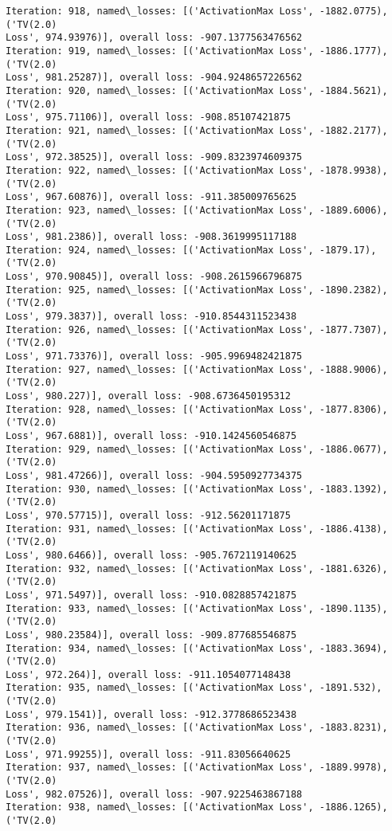\documentclass[10pt]{article}
\begin{document}
\begin{Verbatim}[commandchars=\\\{\}]
Iteration: 918, named\_losses: [('ActivationMax Loss', -1882.0775), ('TV(2.0)
Loss', 974.93976)], overall loss: -907.1377563476562
Iteration: 919, named\_losses: [('ActivationMax Loss', -1886.1777), ('TV(2.0)
Loss', 981.25287)], overall loss: -904.9248657226562
Iteration: 920, named\_losses: [('ActivationMax Loss', -1884.5621), ('TV(2.0)
Loss', 975.71106)], overall loss: -908.85107421875
Iteration: 921, named\_losses: [('ActivationMax Loss', -1882.2177), ('TV(2.0)
Loss', 972.38525)], overall loss: -909.8323974609375
Iteration: 922, named\_losses: [('ActivationMax Loss', -1878.9938), ('TV(2.0)
Loss', 967.60876)], overall loss: -911.385009765625
Iteration: 923, named\_losses: [('ActivationMax Loss', -1889.6006), ('TV(2.0)
Loss', 981.2386)], overall loss: -908.3619995117188
Iteration: 924, named\_losses: [('ActivationMax Loss', -1879.17), ('TV(2.0)
Loss', 970.90845)], overall loss: -908.2615966796875
Iteration: 925, named\_losses: [('ActivationMax Loss', -1890.2382), ('TV(2.0)
Loss', 979.3837)], overall loss: -910.8544311523438
Iteration: 926, named\_losses: [('ActivationMax Loss', -1877.7307), ('TV(2.0)
Loss', 971.73376)], overall loss: -905.9969482421875
Iteration: 927, named\_losses: [('ActivationMax Loss', -1888.9006), ('TV(2.0)
Loss', 980.227)], overall loss: -908.6736450195312
Iteration: 928, named\_losses: [('ActivationMax Loss', -1877.8306), ('TV(2.0)
Loss', 967.6881)], overall loss: -910.1424560546875
Iteration: 929, named\_losses: [('ActivationMax Loss', -1886.0677), ('TV(2.0)
Loss', 981.47266)], overall loss: -904.5950927734375
Iteration: 930, named\_losses: [('ActivationMax Loss', -1883.1392), ('TV(2.0)
Loss', 970.57715)], overall loss: -912.56201171875
Iteration: 931, named\_losses: [('ActivationMax Loss', -1886.4138), ('TV(2.0)
Loss', 980.6466)], overall loss: -905.7672119140625
Iteration: 932, named\_losses: [('ActivationMax Loss', -1881.6326), ('TV(2.0)
Loss', 971.5497)], overall loss: -910.0828857421875
Iteration: 933, named\_losses: [('ActivationMax Loss', -1890.1135), ('TV(2.0)
Loss', 980.23584)], overall loss: -909.877685546875
Iteration: 934, named\_losses: [('ActivationMax Loss', -1883.3694), ('TV(2.0)
Loss', 972.264)], overall loss: -911.1054077148438
Iteration: 935, named\_losses: [('ActivationMax Loss', -1891.532), ('TV(2.0)
Loss', 979.1541)], overall loss: -912.3778686523438
Iteration: 936, named\_losses: [('ActivationMax Loss', -1883.8231), ('TV(2.0)
Loss', 971.99255)], overall loss: -911.83056640625
Iteration: 937, named\_losses: [('ActivationMax Loss', -1889.9978), ('TV(2.0)
Loss', 982.07526)], overall loss: -907.9225463867188
Iteration: 938, named\_losses: [('ActivationMax Loss', -1886.1265), ('TV(2.0)

\end{Verbatim}
\end{document}
